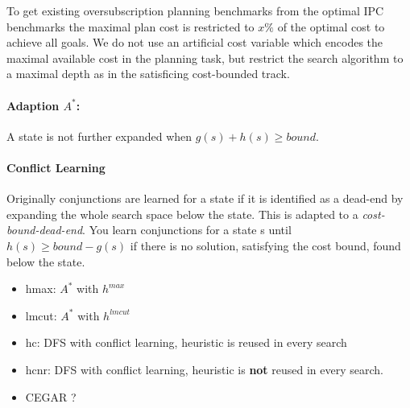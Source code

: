 
    To get existing oversubscription planning benchmarks from the optimal IPC benchmarks the maximal plan 
    cost is restricted to $x\%$ of the optimal cost to achieve all goals. We do not use an artificial 
    cost variable which encodes the maximal available cost in the planning task, but restrict the search
    algorithm to a maximal depth as in the satisficing cost-bounded track. 

    \paragraph{Adaption $A^*$:}
    A state is not further expanded when $g(s) +  h(s) \geq bound$. \\

    \paragraph{Conflict Learning}
    Originally conjunctions are learned for a state if it is identified as a dead-end by
    expanding the whole search space below the state.
    This is adapted to a \textit{cost-bound-dead-end}. You learn conjunctions for a state s until
    $h(s) \geq bound - g(s)$ if there is no solution, satisfying the cost bound, found below the state.

    \begin{itemize}
        \item hmax: $A^*$ with $h^{max}$
        \item lmcut:  $A^*$ with $h^{lmcut}$
        \item hc: DFS with conflict learning, heuristic is reused in every search
        \item hcnr: DFS with conflict learning, heuristic is \textbf{not} reused in every search.
        \item CEGAR ?
    \end{itemize}

